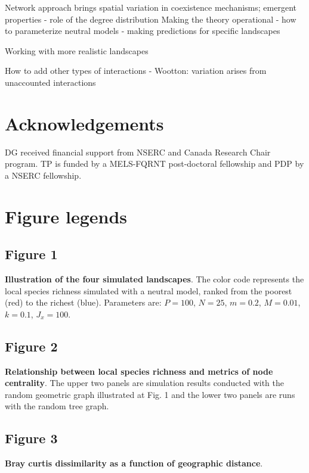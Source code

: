 \documentclass[12pt]{article}
\begin{document}
Network approach brings spatial variation in coexistence mechanisms; emergent properties
- role of the degree distribution
Making the theory operational
- how to parameterize neutral models
- making predictions for specific landscapes

Working with more realistic landscapes

How to add other types of interactions
- Wootton: variation arises from unaccounted interactions


\section{Acknowledgements}
DG received financial support from NSERC and Canada Research Chair program. TP
is funded by a MELS-FQRNT post-doctoral fellowship and PDP by a NSERC
fellowship.
\newpage

\printbibliography

\newpage
\section*{Figure legends}

\subsection*{Figure 1}
\textbf{Illustration of the four simulated landscapes}. The color code
represents the local species richness simulated with a neutral model, ranked
from the poorest (red) to the richest (blue). Parameters are: $P = 100$, $N =
25$, $m = 0.2$, $M = 0.01$, $k = 0.1$, $J_x = 100$.

\subsection*{Figure 2}
\textbf{Relationship between local species richness and metrics of node
centrality}. The upper two panels are simulation results conducted with the
random geometric graph illustrated at Fig. 1 and the lower two panels are runs
with the random tree graph. 

\subsection*{Figure 3}
\textbf{Bray curtis dissimilarity as a function of geographic distance}. 
\end{document}
